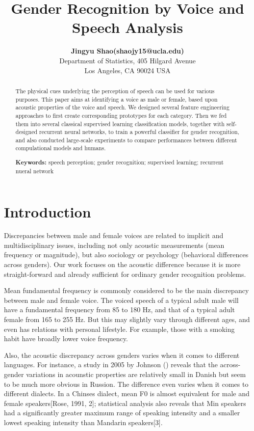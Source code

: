 \documentclass[10pt,letterpaper]{article}
\title{Gender Recognition by Voice and Speech Analysis}
\author{{\large \bf Jingyu Shao(shaojy15@ucla.edu)} \\
  Department of Statistics,  405 Hilgard Avenue\\
  Los Angeles, CA 90024 USA}
\begin{document}
\maketitle


\begin{abstract}
The physical cues underlying the perception of speech can be used for various purposes. This paper aims at identifying a voice as male or female, based upon acoustic properties of the voice and speech. We designed several feature engineering approaches to first create corresponding prototypes for each category. Then we fed them into several classical supervised learning classification models, together with self-designed recurrent neural networks, to train a powerful classifier for gender recognition, and also conducted large-scale experiments to compare performances between different compulational models and humans.

\textbf{Keywords:} 
speech perception; gender recognition; supervised learning; recurrent nueral network
\end{abstract}

\section{Introduction}
Discrepancies between male and female voices are related to implicit and multidisciplinary issues, including not only acoustic measurements (mean frequency or magnitude), but also sociology or psychology (behavioral differences across genders). Our work focuses on the acoustic difference because it is more straight-forward and already sufficient for ordinary gender recognition problems.

Mean fundamental frequency is commonly considered to be the main discrepancy between male and female voice. The voiced speech of a typical adult male will have a fundamental frequency from 85 to 180 Hz, and that of a typical adult female from 165 to 255 Hz. But this may slightly vary through different ages, and even has relations with personal lifestyle. For example, those with a smoking habit have broadly lower voice frequency. 

Also, the acoustic discrepancy across genders varies when it comes to different languages. For instance, a study in 2005 by Johnson () reveals that the across-gender variations in acounstic properties are relatively small in Danish but seem to be much more obvious in Russion. The difference even varies when it comes to different dialects. In a Chinses dialect, mean F0 is almost equivalent for male and female speakers[Rose, 1991, 2]; statistical analysis also reveals that Min speakers had a significantly greater maximum range of speaking intensity and a smaller lowest speaking intensity than Mandarin speakers[3].
\end{document}
